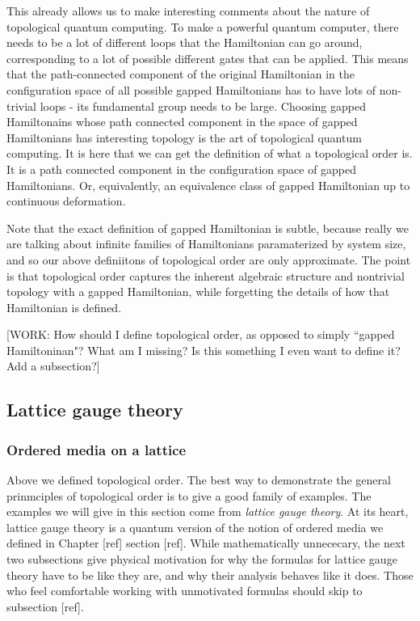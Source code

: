 \documentclass{article}
\theoremstyle{definition}
\numberwithin{figure}{section}
\begin{document}
This already allows us to make interesting comments about the nature of topological quantum computing. To make a powerful quantum computer, there needs to be a lot of different loops that the Hamiltonian can go around, corresponding to a lot of possible different gates that can be applied. This means that the path-connected component of the original Hamiltonian in the configuration space of all possible gapped Hamiltonians has to have lots of non-trivial loops - its fundamental group needs to be large. Choosing gapped Hamiltonains whose path connected component in the space of gapped Hamiltonians has interesting topology is the art of topological quantum computing. It is here that we can get the definition of what a topological order is. It is a path connected component in the configuration space of gapped Hamiltonians. Or, equivalently, an equivalence class of gapped Hamiltonian up to continuous deformation.

Note that the exact definition of gapped Hamiltonian is subtle, because really we are talking about infinite families of Hamiltonians paramaterized by system size, and so our above definiitons of topological order are only approximate. The point is that topological order captures the inherent algebraic structure and nontrivial topology with a gapped Hamiltonian, while forgetting the details of how that Hamiltonian is defined.

[WORK: How should I define topological order, as opposed to simply ``gapped Hamiltoninan"? What am I missing? Is this something I even want to define it? Add a subsection?]

\subsection{Lattice gauge theory}

\subsubsection{Ordered media on a lattice}

Above we defined topological order. The best way to demonstrate the general prinmciples of topological order is to give a good family of examples. The examples we will give in this section come from \textit{lattice gauge theory}. At its heart, lattice gauge theory is a quantum version of the notion of ordered media we defined in Chapter [ref] section [ref]. While mathematically unnececary, the next two subsections give physical motivation for why the formulas for lattice gauge theory have to be like they are, and why their analysis behaves like it does. Those who feel comfortable working with unmotivated formulas should skip to subsection [ref].
\end{document}
